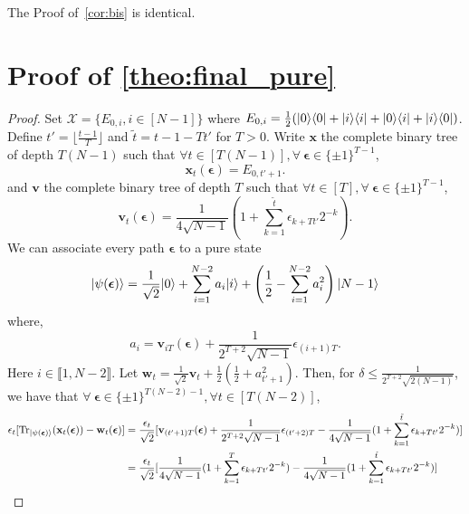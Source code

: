 The Proof of~\cref{cor:bis} is identical.


\section{Proof of \cref{theo:final_pure}}\label{pf:final_pure}

\begin{proof}
    Set $\mathcal{X} = \{E_{0,i},i\in[N-1]\}$ where $E_{0,i}=\frac12(| 0 \rangle \langle 0 | + | i \rangle \langle i | + | 0 \rangle \langle i | + | i \rangle \langle 0 |)$.
    Define $t'=\lfloor \frac {t-1} T \rfloor$ and $\tilde t=t-1-Tt'$ for $T>0$.
    Write $\mathbf{x}$ the complete binary tree of depth $T(N-1)$ such that $\forall t\in[T(N-1)],\forall \ \boldsymbol{\epsilon} \in \{\pm 1\}^{T-1}$,
\begin{equation}
    \mathbf{x}_t (\boldsymbol{\epsilon}) = E_{0,t'+1}. 
\end{equation}
and $\mathbf{v}$ the complete binary tree of depth $T$ such that $\forall t\in[T],\forall \ \boldsymbol{\epsilon} \in \{\pm 1\}^{T-1}$,
\begin{equation}
    \mathbf{v}_t (\boldsymbol{\epsilon}) = \frac1{4\sqrt{N-1}}(1+\sum_{k=1}^{\tilde t}\epsilon_{k+Tt'}2^{-k}).
\end{equation}
We can associate every path $\boldsymbol\epsilon$ to a pure state
\begin{equation}
    \ket{\psi(\boldsymbol\epsilon)}=\frac1 {\sqrt{2}}| 0 \rangle+\sum_{i=1}^{N-2}a_i| i \rangle+\left(\frac12-\sum_{i=1}^{N-2}a_i^2 \right)| N-1 \rangle
\end{equation}
    where,
\begin{equation}
    a_i=\mathbf v_{iT}(\boldsymbol\epsilon)+\frac1{2^{T+2}\sqrt{N-1}}\epsilon_{(i+1)T}.
\end{equation}
Here $i\in\llbracket1,N-2\rrbracket$.
Let $\mathbf w_t=\frac1{\sqrt{2}}\mathbf v_t+\frac12(\frac12+a_{t'+1}^2)$.
Then, for $\delta\le\frac1{2^{T+2}\sqrt{2(N-1)}}$, we have that $\forall \ \boldsymbol{\epsilon} \in \{\pm 1\}^{T(N-2)-1}, \forall t \in [T(N-2)]$,
        \begin{align}
    \label{eq:final}
        \epsilon_t [\operatorname{Tr}_{\ket{\psi(\boldsymbol\epsilon)}}(\mathbf{x}_t(\boldsymbol{\epsilon})) - \mathbf{w}_t (\boldsymbol{\epsilon})] 
        &= \frac{\epsilon_t}{\sqrt{2}}[\mathbf v_{(t'+1)T}(\boldsymbol\epsilon)+\frac1{2^{T+2}\sqrt{N-1}}\epsilon_{(t'+2)T}-\frac1{4\sqrt{N-1}}(1+\sum_{k=1}^{\tilde t}\epsilon_{k+Tt'}2^{-k})]
        \nonumber\\&=\frac{\epsilon_t}{\sqrt{2}}[\frac1{4\sqrt{N-1}}(1+\sum_{k=1}^{T}\epsilon_{k+Tt'}2^{-k})-\frac1{4\sqrt{N-1}}(1+\sum_{k=1}^{\tilde t}\epsilon_{k+Tt'}2^{-k})]

\end{align}
\end{proof}
